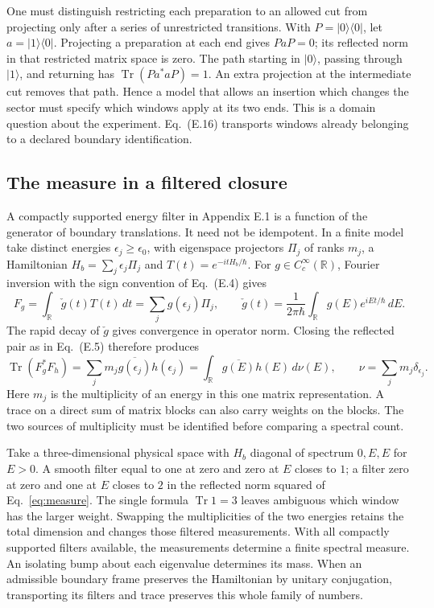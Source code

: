 \documentclass[11pt,letterpaper]{article}
\newcommand{\tr}{\operatorname{Tr}}
\begin{document}
One must distinguish restricting each preparation to an allowed cut
from projecting only after a series of unrestricted transitions. With
\(P=|0\rangle\langle0|\), let \(a=|1\rangle\langle0|\).
Projecting a preparation at each end gives \(PaP=0\); its reflected
norm in that restricted matrix space is zero. The path
starting in \(|0\rangle\), passing through \(|1\rangle\), and returning
has \(\tr(Pa^*aP)=1\). An extra projection at the intermediate cut
removes that path. Hence a model that allows an insertion which changes
the sector must specify which windows apply at its two ends. This is
a domain question about the experiment. Eq.~(E.16) transports windows
already belonging to a declared boundary identification.

\subsection{The measure in a filtered closure}
A compactly supported energy filter in Appendix E.1 is a function of the
generator of boundary translations. It need not be idempotent. In a
finite model take distinct energies \(\epsilon_j\ge\epsilon_0\), with
eigenspace projectors \(\Pi_j\) of ranks \(m_j\), a Hamiltonian
\(H_b=\sum_j\epsilon_j\Pi_j\) and
\(T(t)=e^{-itH_b/\hbar}\). For \(g\in C_c^\infty(\mathbb R)\), Fourier
inversion with the sign convention of Eq.~(E.4) gives
\begin{equation}
 F_g=\int_{\mathbb R}\check g(t)T(t)\,dt
       =\sum_j g(\epsilon_j)\Pi_j,\qquad
 \check g(t)=\frac{1}{2\pi\hbar}\int_{\mathbb R}g(E)e^{iEt/\hbar}\,dE .
 \label{eq:filter}
\end{equation}
The rapid decay of \(\check g\) gives convergence in operator norm.
Closing the reflected pair as in Eq.~(E.5) therefore produces
\begin{equation}
 \tr(F_g^* F_h)
   =\sum_j m_j\overline{g(\epsilon_j)}h(\epsilon_j)
   =\int_{\mathbb R}\overline{g(E)}h(E)\,d\nu(E),\qquad
 \nu=\sum_j m_j\delta_{\epsilon_j}.
 \label{eq:measure}
\end{equation}
Here \(m_j\) is the multiplicity of an energy in this one matrix
representation. A trace on a direct sum of matrix blocks can also carry
weights on the blocks. The two sources of multiplicity must be identified
before comparing a spectral count.

Take a three-dimensional physical space with \(H_b\) diagonal of spectrum
\(0,E,E\) for \(E>0\). A smooth filter equal to one at zero and zero at
\(E\) closes to \(1\); a filter zero at zero and one at \(E\) closes to
\(2\) in the reflected norm squared of Eq.~\eqref{eq:measure}.
The single formula \(\tr 1=3\) leaves ambiguous which window has the
larger weight. Swapping the multiplicities of the two energies retains
the total dimension and changes those filtered measurements. With all
compactly supported filters available, the measurements determine a finite
spectral measure. An isolating bump about each eigenvalue determines its
mass. When an admissible boundary frame preserves the Hamiltonian by
unitary conjugation, transporting its filters and trace preserves this
whole family of numbers.
\end{document}
